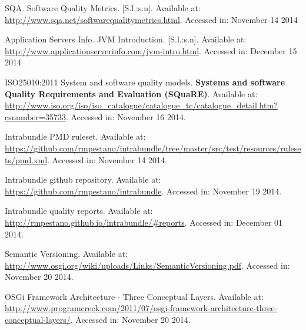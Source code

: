 \documentclass[cic,tc,english]{iiufrgs} %
\begin{document}
\begin{thebibliography}{este-parametro-nao-eh-usado-pelo-estilo-ABNT}
 SQA.
Software Quality Metrics. [S.l.:s.n]. Available at: \url{http://www.sqa.net/softwarequalitymetrics.html}. Accessed in: November 14 2014

 Application Servers Info.
JVM Introduction. [S.l.:s.n]. Available at: \url{http://www.applicationserverinfo.com/jvm-intro.html}. Accessed in: December 15 2014

 ISO25010:2011
System and software quality models. \textbf{Systems and software Quality Requirements and Evaluation (SQuaRE)}. Available at: \url{http://www.iso.org/iso/iso_catalogue/catalogue_tc/catalogue_detail.htm?csnumber=35733}. Accessed in: November 16 2014.

Intrabundle PMD ruleset. Available at: \url{https://github.com/rmpestano/intrabundle/tree/master/src/test/resources/rulesets/pmd.xml}. Accessed in: November 14 2014.

Intrabundle github repository. Available at: \url{https://github.com/rmpestano/intrabundle}. Accessed in: November 19 2014.

Intrabundle quality reports. Available at: \url{http://rmpestano.github.io/intrabundle/#reports}. Accessed in: December 01 2014.

Semantic Versioning. Available at: \url{http://www.osgi.org/wiki/uploads/Links/SemanticVersioning.pdf}. Accessed in: November 20 2014.

OSGi Framework Architecture - Three Conceptual Layers. Available at: \url{http://www.programcreek.com/2011/07/osgi-framework-architecture-three-conceptual-layers/}. Accessed in: November 20 2014.


\end{thebibliography}


\end{document}
